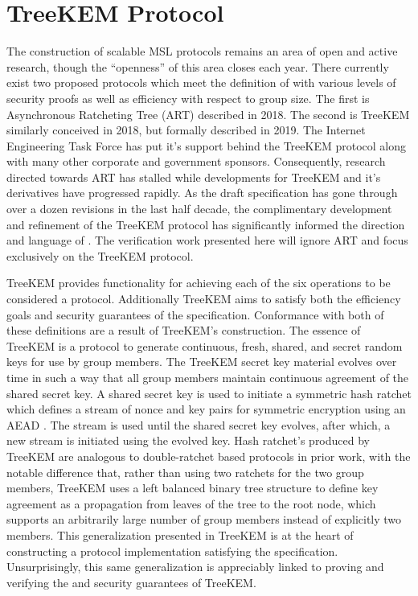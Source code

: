 \hypertarget{sec:treekem-protocol}{%
\section{TreeKEM Protocol}\label{sec:treekem-protocol}}

The construction of scalable MSL protocols remains an area of open and active research, though the ``openness'' of this area closes each year.
There currently exist two proposed protocols which meet the definition of  with various levels of security proofs as well as efficiency with respect to group size.
The first is Asynchronous Ratcheting Tree (ART) \autocite{cohn2018ends} described in 2018.
The second is TreeKEM \autocite{bhargavan:hal-02425247} similarly conceived in 2018, but formally described in 2019.
The Internet Engineering Task Force has put it's support behind the TreeKEM protocol along with many other corporate and government sponsors.
Consequently, research directed towards ART has stalled while developments for TreeKEM and it's derivatives have progressed rapidly.
As the  draft specification has gone through over a dozen revisions in the last half decade, the complimentary development and refinement of the TreeKEM protocol has significantly informed the direction and language of .
The verification work presented here will ignore ART and focus exclusively on the TreeKEM protocol.

TreeKEM provides functionality for achieving each of the six operations to be considered a  protocol.
Additionally TreeKEM aims to satisfy both the efficiency goals and security guarantees of the  specification.
Conformance with both of these definitions are a result of TreeKEM's construction.
The essence of TreeKEM is a protocol to generate continuous, fresh, shared, and secret random keys for use by group members.
The TreeKEM secret key material evolves over time in such a way that all group members maintain continuous agreement of the shared secret key.
A shared secret key is used to initiate a symmetric hash ratchet which defines a stream of nonce and key pairs for symmetric encryption using an AEAD \autocite{bellare2003conventional, kohno2003cwc}.
The stream is used until the shared secret key evolves, after which, a new stream is initiated using the evolved key.
Hash ratchet's produced by TreeKEM are analogous to double-ratchet based protocols in prior work, with the notable difference that, rather than using two ratchets for the two group members, TreeKEM uses a left balanced binary tree structure to define key agreement as a propagation from leaves of the tree to the root node, which supports an arbitrarily large number of group members instead of explicitly two members.
This generalization presented in TreeKEM is at the heart of constructing a protocol implementation satisfying the  specification.
Unsurprisingly, this same generalization is appreciably linked to proving and verifying the  and  security guarantees of TreeKEM.\@

